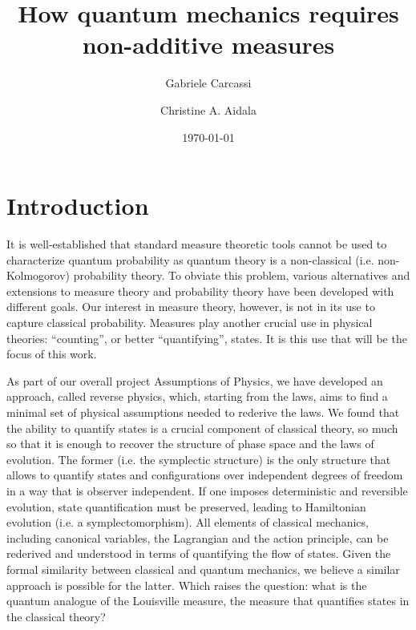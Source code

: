 \documentclass[10pt,twocolumn, nofootinbib]{revtex4-2}
\begin{document}
\title{How quantum mechanics requires non-additive measures}
\author{Gabriele Carcassi}
\author{Christine A. Aidala}

\date{\today}


\begin{abstract}
\end{abstract}

\maketitle

\section{Introduction}

It is well-established that standard measure theoretic tools cannot be used to characterize quantum probability as quantum theory is a non-classical (i.e. non-Kolmogorov) probability theory. To obviate this problem, various alternatives and extensions to measure theory and probability theory have been developed with different goals. Our interest in measure theory, however, is not in its use to capture classical probability. Measures play another crucial use in physical theories: ``counting'', or better ``quantifying'', states. It is this use that will be the focus of this work.

As part of our overall project Assumptions of Physics, we have developed an approach, called reverse physics, which, starting from the laws, aims to find a minimal set of physical assumptions needed to rederive the laws. We found that the ability to quantify states is a crucial component of classical theory, so much so that it is enough to recover the structure of phase space and the laws of evolution. The former (i.e. the symplectic structure) is the only structure that allows to quantify states and configurations over independent degrees of freedom in a way that is observer independent. If one imposes deterministic and reversible evolution, state quantification must be preserved, leading to Hamiltonian evolution (i.e. a symplectomorphism). All elements of classical mechanics, including canonical variables, the Lagrangian and the action principle, can be rederived and understood in terms of quantifying the flow of states. Given the formal similarity between classical and quantum mechanics, we believe a similar approach is possible for the latter. Which raises the question: what is the quantum analogue of the Louisville measure, the measure that quantifies states in the classical theory?
\end{document}
